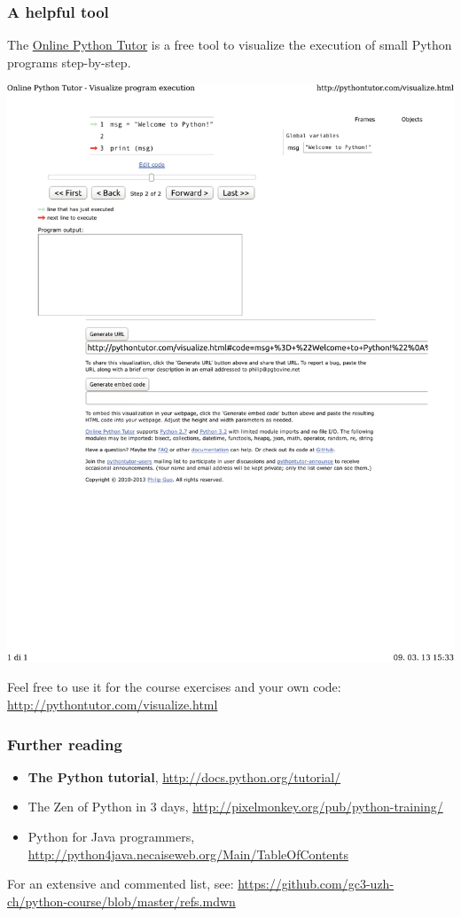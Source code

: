 \documentclass[english,serif,mathserif,xcolor=pdftex,dvipsnames,table]{beamer}
\begin{document}
\begin{frame}
  \frametitle{A helpful tool}

  The \href{http://pythontutor.com}{Online Python Tutor} is a free
  tool to visualize the execution of small Python programs
  step-by-step.

  \+
  \href{http://tinyurl.com/cf5ftwr}{%
    \centering
    \includegraphics[width=1.0\linewidth,viewport=0 600 500 750,clip]{fig/pythontutor}
  }

  \+ Feel free to use it for the course exercises and your own code:
  \url{http://pythontutor.com/visualize.html}
\end{frame}

\begin{frame}
  \frametitle{Further reading}

  \begin{itemize}
    \item \textbf{The Python tutorial},
      {\small \url{http://docs.python.org/tutorial/}}
    \item {The Zen of Python in 3 days},
      {\small \url{http://pixelmonkey.org/pub/python-training/}}
    \item {Python for Java programmers},
      {\small \url{http://python4java.necaiseweb.org/Main/TableOfContents}}
  \end{itemize}

  \+   For an extensive and commented list, see:
  {\footnotesize\url{https://github.com/gc3-uzh-ch/python-course/blob/master/refs.mdwn}}

\end{frame}
\end{document}
